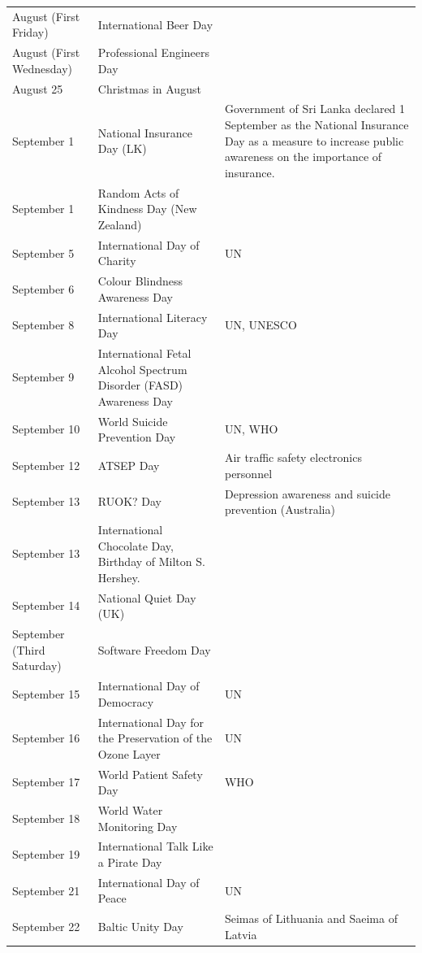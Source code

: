 \documentclass[
  openany]{book}
\begin{document}
\begin{longtable}[t]{>{\raggedright\arraybackslash}p{8em}>{\raggedright\arraybackslash}p{18em}>{\raggedright\arraybackslash}p{10em}}
August (First Friday) & International Beer Day & \\
\addlinespace
\rowcolor{gray!6}  August (First Wednesday) & Professional Engineers Day & \\
August 25 & Christmas in August & \\
\rowcolor{gray!6}  September 1 & National Insurance Day (LK) & Government of Sri Lanka declared 1 September as the National Insurance Day as a measure to increase public awareness on the importance of insurance.\\
September 1 & Random Acts of Kindness Day (New Zealand) & \\
\rowcolor{gray!6}  September 5 & International Day of Charity & UN\\
\addlinespace
September 6 & Colour Blindness Awareness Day & \\
\rowcolor{gray!6}  September 8 & International Literacy Day & UN, UNESCO\\
September 9 & International Fetal Alcohol Spectrum Disorder (FASD) Awareness Day & \\
\rowcolor{gray!6}  September 10 & World Suicide Prevention Day & UN, WHO\\
September 12 & ATSEP Day & Air traffic safety electronics personnel\\
\addlinespace
\rowcolor{gray!6}  September 13 & RUOK? Day & Depression awareness and suicide prevention (Australia)\\
September 13 & International Chocolate Day, Birthday of Milton S. Hershey. & \\
\rowcolor{gray!6}  September 14 & National Quiet Day (UK) & \\
September (Third Saturday) & Software Freedom Day & \\
\rowcolor{gray!6}  September 15 & International Day of Democracy & UN\\
\addlinespace
September 16 & International Day for the Preservation of the Ozone Layer & UN\\
\rowcolor{gray!6}  September 17 & World Patient Safety Day & WHO\\
September 18 & World Water Monitoring Day & \\
\rowcolor{gray!6}  September 19 & International Talk Like a Pirate Day & \\
September 21 & International Day of Peace & UN\\
\addlinespace
\rowcolor{gray!6}  September 22 & Baltic Unity Day & Seimas of Lithuania and Saeima of Latvia\\

\end{longtable}
\end{document}
